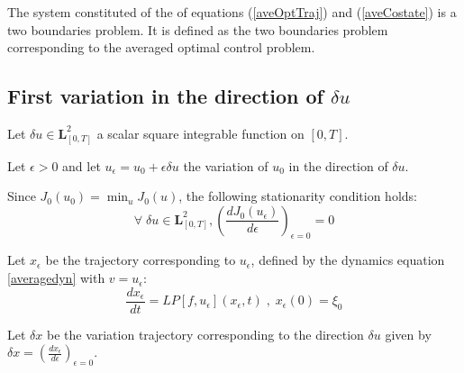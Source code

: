 \documentclass[a4paper,10pt]{article}
\begin{document}
The system constituted of the of equations (\ref{aveOptTraj}) and 
(\ref{aveCostate}) is a two boundaries problem. It is defined as the 
two boundaries problem corresponding to the averaged optimal control 
problem.

\subsection{First variation in the direction of $\delta u$}
    Let $\delta u \in \mathbf{L}_{[0,T]}^2$ a scalar square integrable 
    function on $[0,T]$.
    
    Let $\epsilon > 0$ and let $u_{\epsilon} = u_{0} + \epsilon \delta u$ 
    the variation of $u_{0}$ in the direction of $\delta u$.
    
    Since $J_{0}(u_{0})=\min_{u}J_{0}(u)$, the following stationarity condition 
    holds:
    \begin{equation}
        \forall \; \delta u \in \mathbf{L}_{[0,T]}^2, 
	\left(\frac{dJ_{0}(u_{\epsilon})}{d \epsilon}\right)_{\epsilon=0} = 0 
        \label{J0min}
    \end{equation}
    
    Let $x_{\epsilon}$ be the trajectory corresponding to $u_{\epsilon}$, 
    defined by the dynamics equation \ref{averagedyn} with 
    $v=u_{\epsilon}$:
    \begin{equation}
        \frac{dx_{\epsilon}}{dt}=LP[f,u_{\epsilon}](x_{\epsilon},t)\; , \;
        x_{\epsilon}(0)=\xi_{0}
        \label{aveVarTraj}
    \end{equation}
    
    Let $\delta x$ be the variation trajectory corresponding to the 
    direction $\delta u$ given by 
    $\delta x = \left(\frac{dx_{\epsilon}}{d \epsilon}\right)_{\epsilon =0}$.
    
\end{document}
